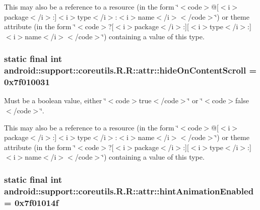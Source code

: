 This may also be a reference to a resource (in the form \char`\"{}$<$code$>$@\mbox{[}$<$i$>$package$<$/i$>$:\mbox{]}$<$i$>$type$<$/i$>$:$<$i$>$name$<$/i$>$$<$/code$>$\char`\"{}) or theme attribute (in the form \char`\"{}$<$code$>$?\mbox{[}$<$i$>$package$<$/i$>$:\mbox{]}\mbox{[}$<$i$>$type$<$/i$>$:\mbox{]}$<$i$>$name$<$/i$>$$<$/code$>$\char`\"{}) containing a value of this type. \hypertarget{classandroid_1_1support_1_1coreutils_1_1_r_1_1attr_b1b660a38328fed9fa303b46799ed85a}{
\subsubsection[{hideOnContentScroll}]{\setlength{\rightskip}{0pt plus 5cm}static final int android::support::coreutils.R.R::attr::hideOnContentScroll = 0x7f010031}}
\label{classandroid_1_1support_1_1coreutils_1_1_r_1_1attr_b1b660a38328fed9fa303b46799ed85a}


Must be a boolean value, either \char`\"{}$<$code$>$true$<$/code$>$\char`\"{} or \char`\"{}$<$code$>$false$<$/code$>$\char`\"{}. 

This may also be a reference to a resource (in the form \char`\"{}$<$code$>$@\mbox{[}$<$i$>$package$<$/i$>$:\mbox{]}$<$i$>$type$<$/i$>$:$<$i$>$name$<$/i$>$$<$/code$>$\char`\"{}) or theme attribute (in the form \char`\"{}$<$code$>$?\mbox{[}$<$i$>$package$<$/i$>$:\mbox{]}\mbox{[}$<$i$>$type$<$/i$>$:\mbox{]}$<$i$>$name$<$/i$>$$<$/code$>$\char`\"{}) containing a value of this type. \hypertarget{classandroid_1_1support_1_1coreutils_1_1_r_1_1attr_ede6fabe0b42d8f353256b4316290e18}{
\subsubsection[{hintAnimationEnabled}]{\setlength{\rightskip}{0pt plus 5cm}static final int android::support::coreutils.R.R::attr::hintAnimationEnabled = 0x7f01014f}}
\label{classandroid_1_1support_1_1coreutils_1_1_r_1_1attr_ede6fabe0b42d8f353256b4316290e18}


